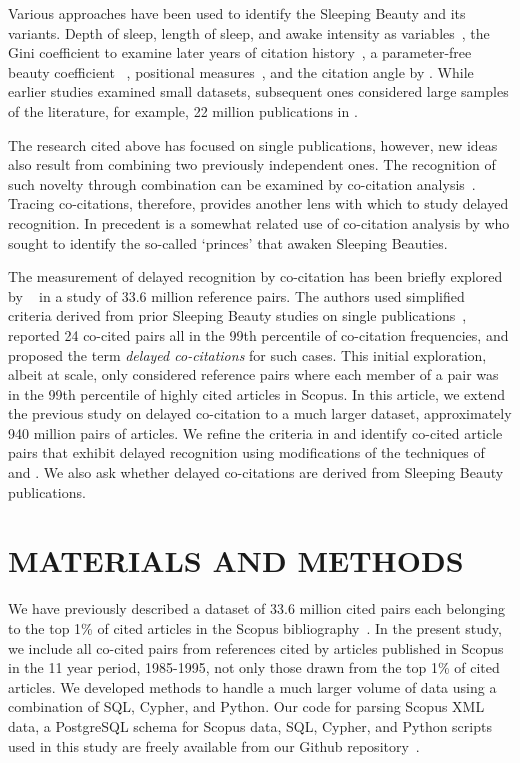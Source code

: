 \documentclass[utf8]{frontiersSCNS}
\begin{document}
Various approaches have been used to identify the Sleeping Beauty and its variants. Depth of sleep, length of sleep, and awake intensity as variables~\citep{Raan2004}, the Gini coefficient to examine later years of citation history~\citep{li_2014}, a parameter-free beauty coefficient ~\citep{Ke2015}, positional measures~\citep{costas2010}, and the citation angle by \cite{ye_bornmann_2018}. While earlier studies examined small datasets, subsequent ones considered large samples of the literature, for example, 22 million publications in \cite{Ke2015}.
	
The research cited above has focused on single publications, however, new ideas also result from combining two previously independent ones. The recognition of such novelty through combination can be examined by co-citation analysis~\citep{MarshakovaShaikevich1973,Small1973,Uzzi2013,Boyack2014,Wang2017,Bradley2020}. Tracing co-citations, therefore, provides another lens with which to study delayed recognition.  In precedent is a somewhat related use of co-citation analysis by \cite{zong_2018,teixeira2017sleeping} who sought to identify the so-called `princes' that awaken Sleeping Beauties. 

The measurement of delayed recognition by co-citation has been briefly explored by ~\cite{devarakonda_2020} in a study of 33.6 million reference pairs. The authors used simplified criteria derived from prior Sleeping Beauty studies on single publications~\citep{Ke2015,Raan2004,Raan2019}, reported 24 co-cited pairs all in the 99th percentile of co-citation frequencies, and proposed the term \emph{delayed co-citations} for such cases. This initial exploration, albeit at scale, only considered reference pairs where each member of a pair was in the 99th percentile of highly cited articles in Scopus.  
In this article, we extend the previous study on delayed co-citation to a much larger dataset, approximately 940 million pairs of articles. We refine the criteria in \cite{devarakonda_2020} and identify co-cited article pairs that exhibit delayed recognition using modifications of 
the techniques of \cite{Raan2004,Raan2019} and  \cite{Ke2015}.  We also ask whether delayed co-citations are derived from Sleeping Beauty publications. 

\section{MATERIALS AND METHODS}

We have previously described a dataset of 33.6 million cited pairs each belonging to the top 1\% of cited articles in the Scopus bibliography~\citep[Figure~2]{devarakonda_2020}. In the present study, we include all co-cited pairs from references cited by articles published in Scopus in the 11 year period, 1985-1995, not only those drawn from the top 1\% of cited articles. We developed methods to handle a much larger volume of data using a combination of SQL, Cypher, and Python. Our code for parsing Scopus XML data, a PostgreSQL schema for Scopus data, SQL, Cypher, and Python scripts used in this study are freely available from our Github repository~\citep{Korobskiy2019}.
\end{document}

